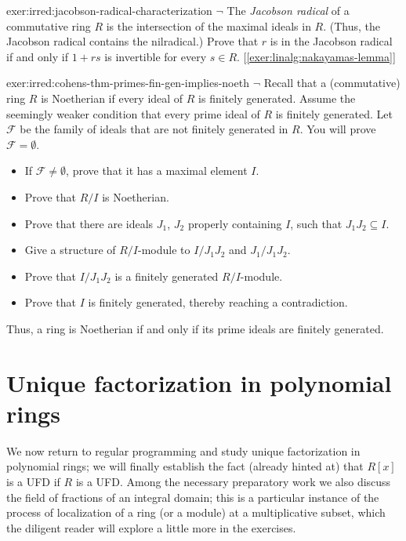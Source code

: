 \begin{exer}{}{exer:irred:jacobson-radical-characterization}
  $\lnot$ The \emph{Jacobson radical} of a commutative ring $R$ is the
  intersection of the maximal ideals in $R$. (Thus, the Jacobson
  radical contains the nilradical.) Prove that $r$ is in the Jacobson
  radical if and only if $1 + rs$ is invertible for every $s \in
  R$. [\ref{exer:linalg:nakayamas-lemma}]
\end{exer}

\begin{exer}{}{exer:irred:cohens-thm-primes-fin-gen-implies-noeth}
  $\lnot$ Recall that a (commutative) ring $R$ is Noetherian if every
  ideal of $R$ is finitely generated. Assume the seemingly weaker
  condition that every prime ideal of $R$ is finitely generated. Let
  $\mathscr{F}$ be the family of ideals that are not finitely
  generated in $R$. You will prove $\mathscr{F} = \emptyset$.
  \begin{itemize}
  \item If $\mathscr{F} \neq \emptyset$, prove that it has a maximal
    element $I$.
  \item Prove that $R/I$ is Noetherian.
  \item Prove that there are ideals $J_1$, $J_2$ properly containing
    $I$, such that $J_1 J_2 \subseteq I$.
  \item Give a structure of $R/I$-module to $I/J_1 J_2$ and
    $J_1/J_1 J_2$.
  \item Prove that $I/J_1 J_2$ is a finitely generated $R/I$-module.
  \item Prove that $I$ is finitely generated, thereby reaching a
    contradiction.
  \end{itemize}
  Thus, a ring is Noetherian if and only if its prime ideals are
  finitely generated.
\end{exer}

\section{Unique factorization in polynomial rings}
\label{sec:irred:unique-factorization-in-polynomial-rings}

We now return to regular programming and study unique factorization in
polynomial rings; we will finally establish the fact (already hinted
at) that $R[x]$ is a UFD if $R$ is a UFD. Among the necessary
preparatory work we also discuss the field of fractions of an integral
domain; this is a particular instance of the process of localization
of a ring (or a module) at a multiplicative subset, which the diligent
reader will explore a little more in the exercises.

